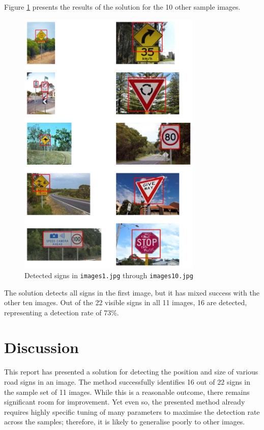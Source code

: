 \newpage

Figure \ref{fig:q1bresults} presents the results of the solution for the 10 other sample images.

\begin{figure}[ht]
  \centering
  \includegraphics[width=0.78\textwidth]{images/q1_results_b.png}
  \caption{Detected signs in \texttt{images1.jpg} through \texttt{images10.jpg}}
  \label{fig:q1bresults}
\end{figure}

The solution detects all signs in the first image, but it has mixed success with the other ten images. Out of the 22 visible signs in all 11 images, 16 are detected, representing a detection rate of 73\%.

\newpage
\section{Discussion}

This report has presented a solution for detecting the position and size of various road signs in an image. The method successfully identifies 16 out of 22 signs in the sample set of 11 images. While this is a reasonable outcome, there remains significant room for improvement. Yet even so, the presented method already requires highly specific tuning of many parameters to maximise the detection rate across the samples; therefore, it is likely to generalise poorly to other images.

